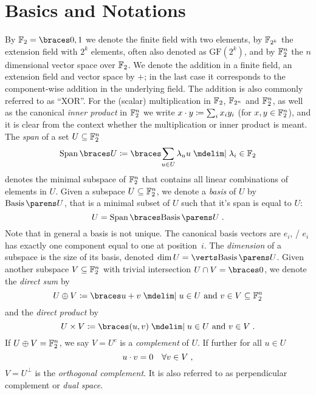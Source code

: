 \section{Basics and Notations}
By $\F_2 = \set{0,1}$ we denote the finite field with two elements, by $\mathbb{F}_{2^k}$ the extension field with $2^k$ elements, often also denoted as $\mathrm{GF}(2^k)$, and by $\mathbb{F}_2^n$ the $n$ dimensional vector space over $\mathbb{F}_2$.
We denote the addition in a finite field, an extension field and vector space by $+$; in the last case it corresponds to the component-wise addition in the underlying field.
The addition is also commonly referred to as \enquote{XOR}.
For the (scalar) multiplication in $\mathbb{F}_2$, $\mathbb{F}_{2^n}$ and $\mathbb{F}_2^n$, as well as the canonical \emph{inner product} in $\mathbb{F}_2^n$ we write $x \cdot y \coloneqq \sum_i x_i y_i$ (for $x,y \in \mathbb{F}_2^n$), and it is clear from the context whether the multiplication or inner product is meant.
The \emph{span} of a set $U \subseteq \mathbb{F}_2^n$
\begin{equation*}
    \Span{U} \coloneqq \set{\sum_{u \in U} \lambda_u u \given \lambda_i \in \F_2}
\end{equation*}
denotes the minimal subspace of $\mathbb{F}_2^n$ that contains all linear combinations of elements in $U$.
Given a subspace $U \subseteq \mathbb{F}_2^n$, we denote a \emph{basis} of $U$ by $\Basis{U}$, that is a minimal subset of $U$ such that it's span is equal to $U$:
\begin{equation*}
    U = \Span{\Basis{U}}\;.
\end{equation*}
Note that in general a basis is not unique.
The canonical basis vectors are $e_i$, \ie/ $e_i$ has exactly one component equal to one at position~$i$.
The \emph{dimension} of a subspace is the size of its basis, denoted $\dim{U} = \abs{\Basis{U}}$.
Given another subspace $V \subseteq \mathbb{F}_2^n$ with trivial intersection $U \cap V = \set{0}$, we denote the \emph{direct sum} by
\begin{equation*}
    U \oplus V \coloneqq \set{u + v \given u \in U\ \text{and}\ v \in V} \subseteq \F_2^n
\end{equation*}
and the \emph{direct product} by
\begin{equation*}
    U \times V \coloneqq \set{(u, v) \given u \in U\ \text{and}\ v \in V}\;.
\end{equation*}
If $U \oplus V = \mathbb{F}_2^n$, we say $V = U^c$ is a \emph{complement} of $U$.
If further for all $u \in U$
\begin{equation*}
    u \cdot v = 0 \quad \forall v \in V\;,
\end{equation*}
$V = U^\bot$ is the \emph{orthogonal complement}.
It is also referred to as perpendicular complement or \emph{dual space}.

